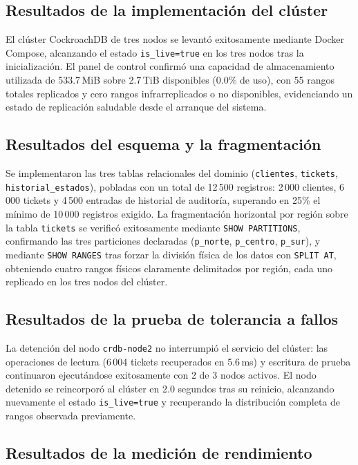 \documentclass[12pt, a4paper]{article}
\begin{document}
\subsection{Resultados de la implementación del clúster}

El clúster CockroachDB de tres nodos se levantó exitosamente mediante Docker Compose, alcanzando el estado \texttt{is\_live=true} en los tres nodos tras la inicialización. El panel de control confirmó una capacidad de almacenamiento utilizada de 533.7\,MiB sobre 2.7\,TiB disponibles (0.0\% de uso), con 55 rangos totales replicados y cero rangos infrarreplicados o no disponibles, evidenciando un estado de replicación saludable desde el arranque del sistema.

\subsection{Resultados del esquema y la fragmentación}

Se implementaron las tres tablas relacionales del dominio (\texttt{clientes}, \texttt{tickets}, \texttt{historial\_estados}), pobladas con un total de 12\,500 registros: 2\,000 clientes, 6\,000 tickets y 4\,500 entradas de historial de auditoría, superando en 25\% el mínimo de 10\,000 registros exigido. La fragmentación horizontal por región sobre la tabla \texttt{tickets} se verificó exitosamente mediante \texttt{SHOW PARTITIONS}, confirmando las tres particiones declaradas (\texttt{p\_norte}, \texttt{p\_centro}, \texttt{p\_sur}), y mediante \texttt{SHOW RANGES} tras forzar la división física de los datos con \texttt{SPLIT AT}, obteniendo cuatro rangos físicos claramente delimitados por región, cada uno replicado en los tres nodos del clúster.

\subsection{Resultados de la prueba de tolerancia a fallos}

La detención del nodo \texttt{crdb-node2} no interrumpió el servicio del clúster: las operaciones de lectura (6\,004 tickets recuperados en 5.6\,ms) y escritura de prueba continuaron ejecutándose exitosamente con 2 de 3 nodos activos. El nodo detenido se reincorporó al clúster en 2.0 segundos tras su reinicio, alcanzando nuevamente el estado \texttt{is\_live=true} y recuperando la distribución completa de rangos observada previamente.

\subsection{Resultados de la medición de rendimiento}
\end{document}
